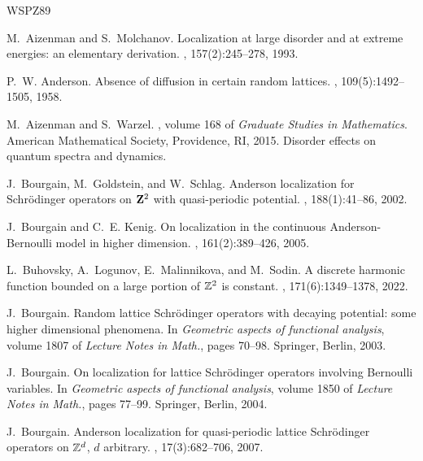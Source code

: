 \documentclass[11pt,reqno,UTF8,twoside]{amsart}
\theoremstyle{definition}
\numberwithin{equation}{section}
\begin{document}
   
%
\begin{thebibliography}{WSPZ89}

M.~Aizenman and S.~Molchanov.
\newblock Localization at large disorder and at extreme energies: an elementary
  derivation.
, 157(2):245--278, 1993.

P.~W. Anderson.
\newblock Absence of diffusion in certain random lattices.
, 109(5):1492--1505, 1958.

M.~Aizenman and S.~Warzel.
, volume 168 of {\em Graduate Studies in
  Mathematics}.
\newblock American Mathematical Society, Providence, RI, 2015.
\newblock Disorder effects on quantum spectra and dynamics.

J.~Bourgain, M.~Goldstein, and W.~Schlag.
\newblock Anderson localization for {S}chr\"{o}dinger operators on {$\bold
  Z^2$} with quasi-periodic potential.
, 188(1):41--86, 2002.

J.~Bourgain and C.~E. Kenig.
\newblock On localization in the continuous {A}nderson-{B}ernoulli model in
  higher dimension.
, 161(2):389--426, 2005.

L.~Buhovsky, A.~Logunov, E.~Malinnikova, and M.~Sodin.
\newblock A discrete harmonic function bounded on a large portion of {$\Bbb
  Z^2$} is constant.
, 171(6):1349--1378, 2022.

J.~Bourgain.
\newblock Random lattice {S}chr\"{o}dinger operators with decaying potential:
  some higher dimensional phenomena.
\newblock In {\em Geometric aspects of functional analysis}, volume 1807 of
  {\em Lecture Notes in Math.}, pages 70--98. Springer, Berlin, 2003.

J.~Bourgain.
\newblock On localization for lattice {S}chr\"{o}dinger operators involving
  {B}ernoulli variables.
\newblock In {\em Geometric aspects of functional analysis}, volume 1850 of
  {\em Lecture Notes in Math.}, pages 77--99. Springer, Berlin, 2004.

J.~Bourgain.
\newblock Anderson localization for quasi-periodic lattice {S}chr\"{o}dinger
  operators on {$\Bbb Z^d$}, {$d$} arbitrary.
, 17(3):682--706, 2007.


\end{thebibliography}
\end{document}
